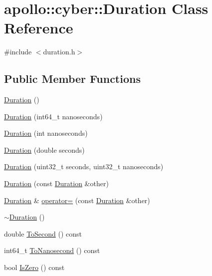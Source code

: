 \hypertarget{classapollo_1_1cyber_1_1Duration}{\section{apollo\-:\-:cyber\-:\-:Duration Class Reference}
\label{classapollo_1_1cyber_1_1Duration}
}


{\ttfamily \#include $<$duration.\-h$>$}

\subsection*{Public Member Functions}
\begin{DoxyCompactItemize}
\item 
\hyperlink{classapollo_1_1cyber_1_1Duration_a7a5e661b09ebf84ccbd8dbead9f77963}{Duration} ()
\item 
\hyperlink{classapollo_1_1cyber_1_1Duration_a16699eaf9e0a21e070ad63b6fe7993c6}{Duration} (int64\-\_\-t nanoseconds)
\item 
\hyperlink{classapollo_1_1cyber_1_1Duration_abb9c8becd41cc055936a2a18195735a8}{Duration} (int nanoseconds)
\item 
\hyperlink{classapollo_1_1cyber_1_1Duration_a5496457a72e19aafa01eadee586c0666}{Duration} (double seconds)
\item 
\hyperlink{classapollo_1_1cyber_1_1Duration_a766cc1a77762fbf1868b31ccea3a454c}{Duration} (uint32\-\_\-t seconds, uint32\-\_\-t nanoseconds)
\item 
\hyperlink{classapollo_1_1cyber_1_1Duration_a96eea1cb85abd7f665b8ffd2ae6e6346}{Duration} (const \hyperlink{classapollo_1_1cyber_1_1Duration}{Duration} \&other)
\item 
\hyperlink{classapollo_1_1cyber_1_1Duration}{Duration} \& \hyperlink{classapollo_1_1cyber_1_1Duration_ae98ef6b05c7ab3e66b49353f5461db86}{operator=} (const \hyperlink{classapollo_1_1cyber_1_1Duration}{Duration} \&other)
\item 
\hyperlink{classapollo_1_1cyber_1_1Duration_a83ef21a27de322184c9faa25026d88c8}{$\sim$\-Duration} ()
\item 
double \hyperlink{classapollo_1_1cyber_1_1Duration_a61ed856e5c40cf6675845a27c7d7182f}{To\-Second} () const 
\item 
int64\-\_\-t \hyperlink{classapollo_1_1cyber_1_1Duration_aa5e9e105c79b7087494cb7b6677f0c85}{To\-Nanosecond} () const 
\item 
bool \hyperlink{classapollo_1_1cyber_1_1Duration_aa9acb321bac196fc2fb5f6e84825bb6a}{Is\-Zero} () const 

\end{DoxyCompactItemize}
